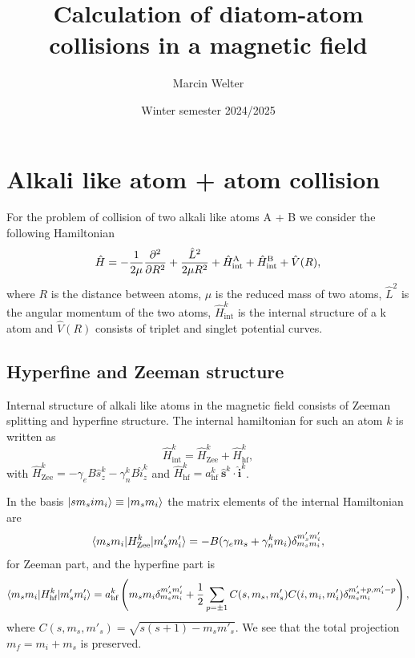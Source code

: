 \documentclass[a4paper]{article}
\title{Calculation of diatom-atom collisions in a magnetic field}
\author{Marcin Welter}
\date{Winter semester 2024/2025}
\begin{document}
\maketitle


\section{Alkali like atom + atom collision}\label{sec:atom_atom}
    For the problem of collision of two alkali like atoms A + B we consider the following Hamiltonian
    \begin{equation}
        \hat{H} = -\frac{1}{2\mu}\pdv[order=2]{}{R} + \frac{\hat{L}^2}{2\mu R^2}
            + \hat{H}^\text{A}_\text{int} + \hat{H}^\text{B}_\text{int} + \hat{V}(R),
    \end{equation}
    where $R$ is the distance between atoms, $\mu$ is the reduced mass of two atoms, 
    \(\hat{L}^2\) is the angular momentum of the two atoms,
    \(\hat{H}^k_\text{int}\) is the internal structure of a k atom and \(\hat{V}(R)\) 
    consists of triplet and singlet potential curves.

\subsection{Hyperfine and Zeeman structure}
    Internal structure of alkali like atoms in the magnetic field consists of Zeeman splitting and
    hyperfine structure. The internal hamiltonian for such an atom $k$ is written as
    \begin{equation}\label{eq:alkali_hamiltonian_int}
        \hat{H}^k_\text{int} = \hat{H}^k_\text{Zee} + \hat{H}^k_\text{hf},
    \end{equation}
    with \(\hat{H}^k_\text{Zee} = -\gamma_e B \hat{s}^k_z - \gamma^k_n B \hat{i}^k_z\) and 
    \(\hat{H}^k_\text{hf} = a^k_\text{hf} \ \hat{\mathbf{s}}^k \cdot \hat{\mathbf{i}}^k\).

    In the basis \(\ket{s m_s i m_i} \equiv \ket{m_s m_i}\) the matrix elements of the internal Hamiltonian are
    \begin{equation}
        \braket{m_s m_i | H^k_\text{Zee} | m'_s m'_i} = -B(\gamma_e m_s + \gamma^k_n m_i) \delta^{m'_s m'_i}_{m_s m_i},
    \end{equation}
    for Zeeman part, and the hyperfine part is
    \begin{equation}
        \braket{m_s m_i | H^k_\text{hf} | m'_s m'_i} = a^k_\text{hf} 
            \left(
                m_s m_i \delta_{m_s m_i}^{m'_s m'_i} 
                + \frac{1}{2}\sum_{p = \pm 1} C(s, m_s, m'_s) C(i, m_i, m'_i)\delta_{m_s m_i}^{m'_s + p, m'_i - p}
            \right),
    \end{equation}
    where \(C(s, m_s, m'_s) = \sqrt{s(s + 1) - m_s m'_s}\). 
    We see that the total projection $m_f = m_i + m_s$ is preserved.
\end{document}
